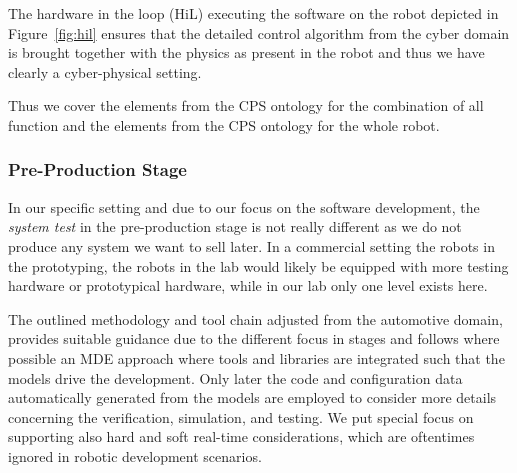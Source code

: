 %
The hardware in the loop (HiL) executing the software on the robot depicted in Figure~\ref{fig:hil} ensures that the detailed control algorithm from the cyber domain is brought together with the physics as present in the robot and thus we have clearly a cyber-physical setting. 

Thus we cover the elements \CPSCyberPart from the CPS ontology for the combination of all function and the elements \CPSPhysicalPart from the CPS ontology for the whole robot.




\subsubsection{Pre-Production Stage}
%
In our specific setting and due to our focus on the software development, the \emph{system test} in the pre-production stage is not really different as we do not produce any system we want to sell later. In a commercial setting the robots in the prototyping, the robots in the lab would likely be equipped with more testing hardware or prototypical hardware, while in our lab only one level exists here.

The outlined methodology and tool chain adjusted from the automotive domain, provides suitable guidance due to the different focus in stages and follows where possible an MDE approach where tools and libraries are integrated such that the models drive the development. Only later the code and configuration data automatically generated from the models are employed to consider more details concerning the verification, simulation, and testing.
%
We put special focus on supporting also hard and soft real-time considerations, which are oftentimes ignored in robotic development scenarios.









